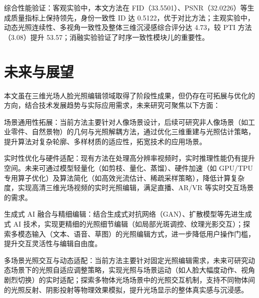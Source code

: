 综合性能验证：客观实验中，本文方法在 FID（33.5501）、PSNR（32.0226）等生成质量指标上保持领先，身份一致性 ID 达 0.5122，优于对比方法；主观实验中，动态光照连续性、多视角一致性及整体三维沉浸感综合评分达 4.73，较 PTI 方法（3.08）提升 53.57；消融实验验证了时序一致性模块儿的重要性。

\section{未来与展望}
本文虽在三维光场人脸光照编辑领域取得了阶段性成果，但仍存在可拓展与优化的方向，结合技术发展趋势与实际应用需求，未来研究可聚焦以下方面：

场景通用性拓展：当前方法主要针对人像场景设计，后续可研究非人像场景（如工业零件、自然景物）的几何与光照解耦方法，通过优化三维重建与光照估计策略，提升算法对复杂轮廓、多样材质的适应性，拓宽技术的应用场景。

实时性优化与硬件适配：现有方法在处理高分辨率视频时，实时推理性能仍有提升空间。未来可通过模型轻量化（如剪枝、量化、蒸馏）、硬件加速（如 GPU/TPU 专用算子优化）及算法简化（如高效光流估计、稀疏采样策略），降低计算复杂度，实现高清三维光场视频的实时光照编辑，满足直播、AR/VR 等实时交互场景的需求。

生成式 AI 融合与精细编辑：结合生成式对抗网络（GAN）、扩散模型等先进生成式 AI 技术，实现更精细的光照细节编辑（如局部光斑调控、纹理光影交互）；探索多模态输入（文本、语音、草图）的光照编辑方式，进一步降低用户操作门槛，提升交互灵活性与编辑自由度。

多场景光照交互与动态适配：当前方法主要针对固定光照编辑需求，未来可研究动态场景下的光照自适应调整策略，实现光照与场景运动（如人脸大幅度动作、视角剧烈切换）的实时适配；探索多物体光场场景中的光照交互机制，支持不同物体间的光照反射、阴影投射等物理效果模拟，提升光场显示的整体真实感与沉浸感。

